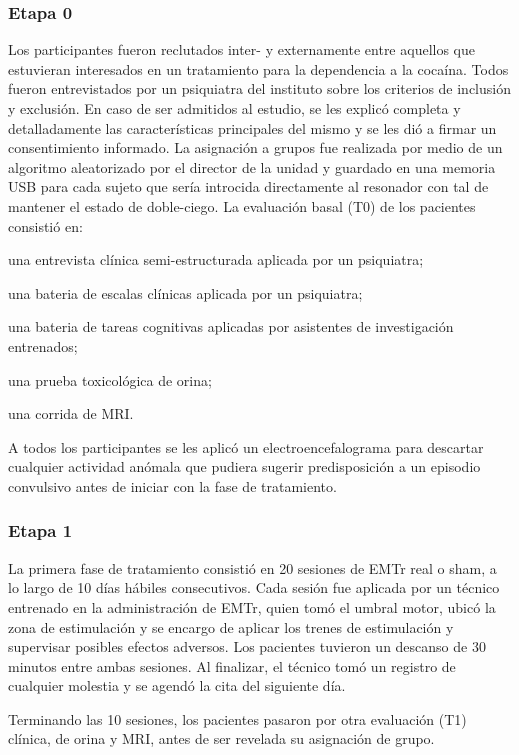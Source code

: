 \subsubsection{Etapa 0}
Los participantes fueron reclutados inter- y externamente entre aquellos que estuvieran interesados en un tratamiento para la dependencia a la cocaína.
Todos fueron entrevistados por un psiquiatra del instituto sobre los criterios de inclusión y exclusión.
En caso de ser admitidos al estudio, se les explicó completa y detalladamente las características principales del mismo y se les dió a firmar un consentimiento informado.
La asignación a grupos fue realizada por medio de un algoritmo aleatorizado por el director de la unidad y guardado en una memoria USB para cada sujeto que sería introcida directamente al resonador con tal de mantener el estado de doble-ciego.
La evaluación basal (T0) de los pacientes consistió en:
\begin{enumerate*}[label=\emph{\alph*})]
    \item una entrevista clínica semi-estructurada aplicada por un psiquiatra;
    \item una bateria de escalas clínicas aplicada por un psiquiatra;
    \item una bateria de tareas cognitivas aplicadas por asistentes de investigación entrenados;
    \item una prueba toxicológica de orina;
    \item una corrida de MRI.
\end{enumerate*}
A todos los participantes se les aplicó un electroencefalograma para descartar cualquier actividad anómala que pudiera sugerir predisposición a un episodio convulsivo antes de iniciar con la fase de tratamiento.

\subsubsection{Etapa 1}
La primera fase de tratamiento consistió en 20 sesiones de EMTr real o sham, a lo largo de 10 días hábiles consecutivos. Cada sesión fue aplicada por un técnico entrenado en la administración de EMTr, quien tomó el umbral motor, ubicó la zona de estimulación y se encargo de aplicar los trenes de estimulación y supervisar posibles efectos adversos.
Los pacientes tuvieron un descanso de 30 minutos entre ambas sesiones.
Al finalizar, el técnico tomó un registro de cualquier molestia y se agendó la cita del siguiente día.\par
Terminando las 10 sesiones, los pacientes pasaron por otra evaluación (T1) clínica, de orina y MRI, antes de ser revelada su asignación de grupo.

